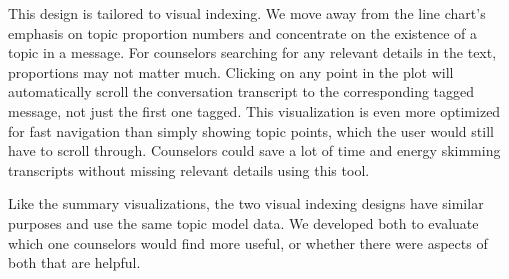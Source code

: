 This design is tailored to visual indexing. We move away from the line chart's emphasis on topic proportion numbers and concentrate on the existence of a topic in a message. For counselors searching for any relevant details in the text, proportions may not matter much. Clicking on any point in the plot will automatically scroll the conversation transcript to the corresponding tagged message, not just the first one tagged. This visualization is even more optimized for fast navigation than simply showing topic points, which the user would still have to scroll through. Counselors could save a lot of time and energy skimming transcripts without missing relevant details using this tool.

Like the summary visualizations, the two visual indexing designs have similar purposes and use the same topic model data. We developed both to evaluate which one counselors would find more useful, or whether there were aspects of both that are helpful.
